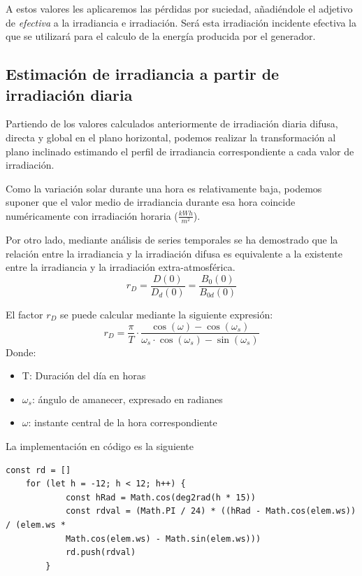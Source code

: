A estos valores les aplicaremos las pérdidas por suciedad, añadiéndole el adjetivo de \textit{efectiva} a la irradiancia e irradiación. Será esta irradiación incidente efectiva la que se utilizará para el calculo de la energía producida por el generador.

\subsection{Estimación de irradiancia a partir de irradiación diaria}
\label{section:3.5.1}
Partiendo de los valores calculados anteriormente de irradiación diaria difusa, directa y global en el plano horizontal, podemos realizar la transformación al plano inclinado estimando el perfil de irradiancia correspondiente a cada valor de irradiación.

Como la variación solar durante una hora es relativamente baja, podemos suponer que el valor medio de irradiancia durante esa hora coincide numéricamente con irradiación horaria ($ \frac{kWh}{m^2}$).

Por otro lado, mediante análisis de series temporales se ha demostrado que la relación entre la irradiancia y la irradiación difusa es equivalente a la existente entre la irradiancia y la irradiación extra-atmosférica.
\begin{equation}
	r_D = \frac{D(0)}{D_d(0)} = \frac{B_0(0)}{B_{0d}(0)	}
\end{equation}

El factor $r_D$  se puede calcular mediante la siguiente expresión:
\begin{equation}
r_D = \frac{\pi}{T}\cdot\frac{\cos(\omega)-\cos(\omega_s)}{\omega_s\cdot\cos(\omega_s)-\sin(\omega_s)}
\end{equation}
Donde:
\begin{itemize}
\item T: Duración del día en horas
\item $\omega_s$: ángulo de amanecer, expresado en radianes
\item $\omega$: instante central de la hora correspondiente
\end{itemize}

La implementación en código es la siguiente

\begin{lstlisting}[style=ES6, caption={Cálculo de rD}]
	const rd = []
	for (let h = -12; h < 12; h++) {
			const hRad = Math.cos(deg2rad(h * 15))
			const rdval = (Math.PI / 24) * ((hRad - Math.cos(elem.ws)) / (elem.ws * 
			Math.cos(elem.ws) - Math.sin(elem.ws)))
			rd.push(rdval)
		}
\end{lstlisting}

